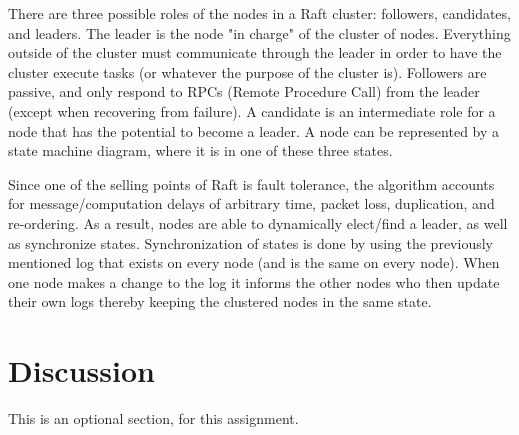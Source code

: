 \documentclass[11pt]{article}
\begin{document}
There are three possible roles of the nodes in a Raft cluster: followers, candidates, and leaders. The leader is the node "in charge" of the cluster of nodes. Everything outside of the cluster must communicate through the leader in order to have the cluster execute tasks (or whatever the purpose of the cluster is). Followers are passive, and only respond to RPCs (Remote Procedure Call) from the leader (except when recovering from failure). A candidate is an intermediate role for a node that has the potential to become a leader. A node can be represented by a state machine diagram, where it is in one of these three states.

Since one of the selling points of Raft is fault tolerance, the algorithm accounts for message/computation delays of arbitrary time, packet loss, duplication, and re-ordering. As a result, nodes are able to dynamically elect/find a leader, as well as synchronize states. Synchronization of states is done by using the previously mentioned log that exists on every node (and is the same on every node). When one node makes a change to the log it informs the other nodes who then update their own logs thereby keeping the clustered nodes in the same state.

\section{Discussion}
This is an optional section, for this assignment.
\end{document}
